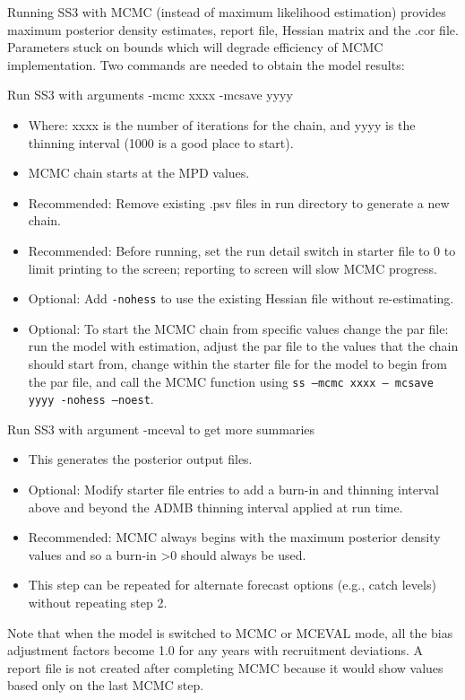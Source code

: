  Running SS3 with MCMC (instead of maximum likelihood estimation) provides maximum posterior density estimates, report file, Hessian matrix and the .cor file. Parameters stuck on bounds which will degrade efficiency of MCMC implementation. Two commands are needed to obtain the model results:
 
\noindent Run SS3 with arguments -mcmc xxxx -mcsave yyyy
 \begin{itemize}
 	\item Where: xxxx is the number of iterations for the chain, and yyyy is the thinning interval (1000 is a good place to start).
 	\item MCMC chain starts at the MPD values.
 	\item Recommended: Remove existing .psv files in run directory to generate a new chain.
 	\item Recommended: Before running, set the run detail switch in starter file to 0 to limit printing to the screen; reporting to screen will slow MCMC progress.
 	\item Optional: Add \texttt{-nohess} to use the existing Hessian file without re-estimating.
 	\item Optional: To start the MCMC chain from specific values change the par file: run the model with estimation, adjust the par file to the values that the chain should start from, change within the starter file for the model to begin from the par file, and call the MCMC function using \texttt{ss –mcmc xxxx – mcsave yyyy -nohess –noest}.
 \end{itemize}
	
\noindent Run SS3 with argument -mceval to get more summaries
\begin{itemize}
	\item This generates the posterior output files.
	\item Optional: Modify starter file entries to add a burn-in and thinning interval above and beyond the ADMB thinning interval applied at run time.
	\item Recommended: MCMC always begins with the maximum posterior density values and so a burn-in >0 should always be used.
	\item This step can be repeated for alternate forecast options (e.g., catch levels) without repeating step 2.
\end{itemize}

Note that when the model is switched to MCMC or MCEVAL mode, all the bias adjustment factors become 1.0 for any years with recruitment deviations. A report file is not created after completing MCMC because it would show values based only on the last MCMC step.

\pagebreak